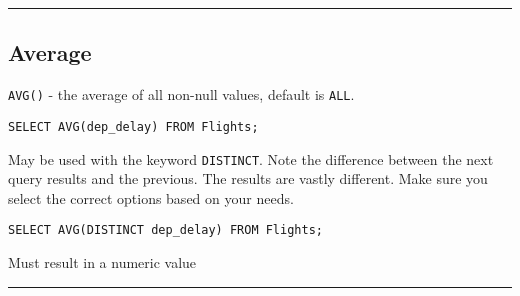 \documentclass{article}
\begin{document}
  
  

\hspace{-0.5cm}\rule[-0.101in]{\textwidth}{0.0025in}
    
  
 
 
 
 
 
 
 
 
 
 
 
 
 
 
 
 
 
 
 
 
 
  

\subsection*{Average}

\begin{outline}
 
    \1 \texttt{AVG()} - the average of all non-null values, default is \texttt{ALL}.
\begin{lstlisting}[frame=single]  
SELECT AVG(dep_delay) FROM Flights;
\end{lstlisting}                
\vspace{-0.5cm}

    \1 May be used with the keyword \texttt{DISTINCT}.  Note the difference between the next query results and the previous.   The results are vastly different.  Make sure you select the correct options based on your needs.   
\begin{lstlisting}[frame=single]  
SELECT AVG(DISTINCT dep_delay) FROM Flights;
\end{lstlisting}                
\vspace{-0.5cm}     

     
    \1 Must result in a numeric value
   
\end{outline}
 
  
  

\hspace{-0.5cm}\rule[-0.101in]{\textwidth}{0.0025in}
\vspace{0.5cm} 
  
  
   
\end{document}

